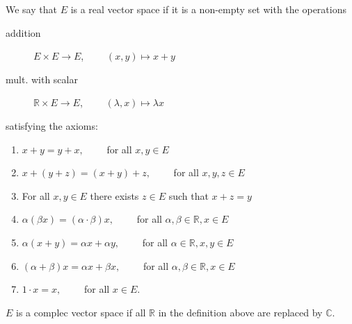 \begin{definition*}
	We say that $E$ is a real vector space  if it is a non-empty set with the operations 
	\begin{description}
		\item[addition] $E \times E \to E$, $\qquad (x,y) \mapsto x+y$
		\item[mult. with scalar] $\mathbb{R} \times E \to E$, $ \qquad (\lambda,x) \mapsto \lambda x$ 
	\end{description}
	satisfying the axioms:
	\begin{enumerate}[(1)]
		\item $x+y = y+x, \qquad$ for all $x,y \in E$
		\item $x+(y+z)= (x+y)+z, \qquad $ for all $x,y,z \in E$
		\item For all $x,y \in E$ there exists $z \in E$ such that $x+z = y$
		\item $\alpha (\beta x) = (\alpha \cdot \beta)x, \qquad $ for all $\alpha,\beta \in \mathbb{R}, x \in E$
		\item $\alpha(x+y) = \alpha x+ \alpha y, \qquad $ for all $\alpha \in \mathbb{R}, x,y \in E$
		\item $(\alpha + \beta) x = \alpha x + \beta x, \qquad $ for all $\alpha, \beta \in \mathbb{R}, x \in E$
		\item $1 \cdot x = x, \qquad $ for all $x \in E$.  
	\end{enumerate}
\end{definition*}
\begin{bemerkung}
	$E$ is a complec vector space if all $\mathbb{R}$ in the definition above are replaced by $\mathbb{C}$.
\end{bemerkung}
